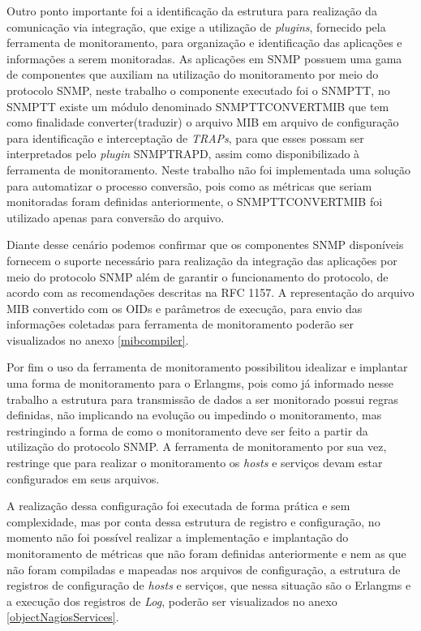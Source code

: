 Outro ponto importante foi a identificação da estrutura para realização da comunicação via integração, que exige a utilização de \textit{plugins}, fornecido pela ferramenta de monitoramento, para organização e identificação das aplicações e informações a serem monitoradas. As aplicações em \acrshort{SNMP} possuem uma gama de componentes que auxiliam na utilização do monitoramento por meio do protocolo \acrshort{SNMP}, neste trabalho o componente executado foi o SNMPTT, no SNMPTT existe um módulo denominado SNMPTTCONVERTMIB que tem como finalidade converter(traduzir) o arquivo MIB em arquivo de configuração para identificação e interceptação de \textit{TRAPs}, para que esses possam ser interpretados pelo \textit{plugin} SNMPTRAPD, assim como disponibilizado à ferramenta de monitoramento. Neste trabalho não foi implementada uma solução para automatizar o processo conversão, pois como as métricas que seriam monitoradas foram definidas anteriormente, o SNMPTTCONVERTMIB foi utilizado apenas para conversão do arquivo.

Diante desse cenário podemos confirmar que os componentes \acrshort{SNMP} disponíveis fornecem o suporte necessário para realização da integração das aplicações por meio do protocolo \acrshort{SNMP} além de garantir o funcionamento do protocolo, de acordo com as recomendações descritas na \acrshort{RFC} 1157. A representação do arquivo MIB convertido com os \acrshort{OID}s e parâmetros de execução, para envio das informações coletadas para ferramenta de monitoramento poderão ser visualizados no anexo \ref{mibcompiler}.     


Por fim o uso da ferramenta de monitoramento possibilitou idealizar e implantar uma forma de monitoramento para o Erlangms, pois como já informado nesse trabalho a estrutura para transmissão de dados a ser monitorado possui regras definidas, não implicando na evolução ou impedindo o monitoramento, mas restringindo a forma de como o monitoramento deve ser feito a partir da utilização do protocolo \acrshort{SNMP}. A ferramenta de monitoramento por sua vez, restringe que para realizar o monitoramento os \textit{hosts} e serviços devam estar configurados em seus arquivos. 

A realização dessa configuração foi executada de forma prática e sem complexidade, mas por conta dessa estrutura de registro e configuração, no momento não foi possível realizar a implementação e implantação do monitoramento de métricas que não foram definidas anteriormente e nem as que não foram compiladas e mapeadas nos arquivos de configuração, a estrutura de registros de configuração de \textit{hosts} e serviços, que nessa situação são o Erlangms e a execução dos registros de \textit{Log}, poderão ser visualizados no anexo \ref{objectNagiosServices}.

